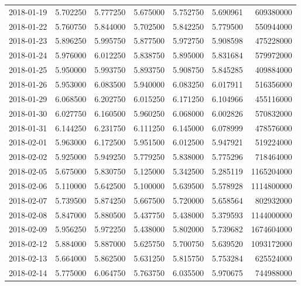 \begin{tabular}{lrrrrrr}
2018-01-19 &    5.702250 &    5.777250 &    5.675000 &    5.752750 &    5.690961 &   609380000 \\
2018-01-22 &    5.760750 &    5.844000 &    5.702500 &    5.842250 &    5.779500 &   550944000 \\
2018-01-23 &    5.896250 &    5.995750 &    5.877500 &    5.972750 &    5.908598 &   475228000 \\
2018-01-24 &    5.976000 &    6.012250 &    5.838750 &    5.895000 &    5.831684 &   579972000 \\
2018-01-25 &    5.950000 &    5.993750 &    5.893750 &    5.908750 &    5.845285 &   409884000 \\
2018-01-26 &    5.953000 &    6.083500 &    5.940000 &    6.083250 &    6.017911 &   516356000 \\
2018-01-29 &    6.068500 &    6.202750 &    6.015250 &    6.171250 &    6.104966 &   455116000 \\
2018-01-30 &    6.027750 &    6.160500 &    5.960250 &    6.068000 &    6.002826 &   570832000 \\
2018-01-31 &    6.144250 &    6.231750 &    6.111250 &    6.145000 &    6.078999 &   478576000 \\
2018-02-01 &    5.963000 &    6.172500 &    5.951500 &    6.012500 &    5.947921 &   519224000 \\
2018-02-02 &    5.925000 &    5.949250 &    5.779250 &    5.838000 &    5.775296 &   718464000 \\
2018-02-05 &    5.675000 &    5.830750 &    5.125000 &    5.342500 &    5.285119 &  1165204000 \\
2018-02-06 &    5.110000 &    5.642500 &    5.100000 &    5.639500 &    5.578928 &  1114800000 \\
2018-02-07 &    5.739500 &    5.874250 &    5.667500 &    5.720000 &    5.658564 &   802932000 \\
2018-02-08 &    5.847000 &    5.880500 &    5.437750 &    5.438000 &    5.379593 &  1144000000 \\
2018-02-09 &    5.956250 &    5.972250 &    5.438000 &    5.802000 &    5.739682 &  1674604000 \\
2018-02-12 &    5.884000 &    5.887000 &    5.625750 &    5.700750 &    5.639520 &  1093172000 \\
2018-02-13 &    5.664000 &    5.862500 &    5.631250 &    5.815750 &    5.753284 &   625524000 \\
2018-02-14 &    5.775000 &    6.064750 &    5.763750 &    6.035500 &    5.970675 &   744988000 \\

\end{tabular}
